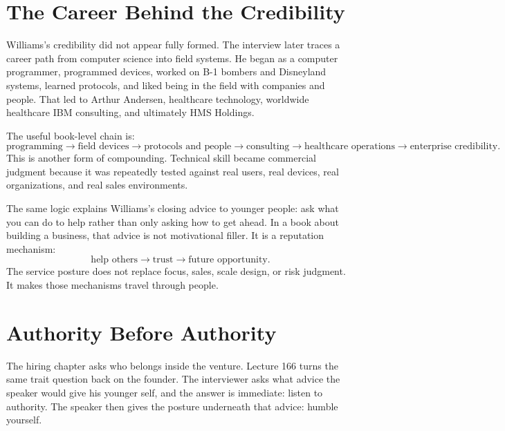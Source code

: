 \documentclass[11pt,oneside]{book}
\begin{document}
\section{The Career Behind the Credibility}

Williams's credibility did not appear fully formed. The interview later traces a career path from computer science into field systems. He began as a computer programmer, programmed devices, worked on B-1 bombers and Disneyland systems, learned protocols, and liked being in the field with companies and people. That led to Arthur Andersen, healthcare technology, worldwide healthcare IBM consulting, and ultimately HMS Holdings.

The useful book-level chain is:
\[
\text{programming}
\longrightarrow
\text{field devices}
\longrightarrow
\text{protocols and people}
\longrightarrow
\text{consulting}
\longrightarrow
\text{healthcare operations}
\longrightarrow
\text{enterprise credibility}.
\]
This is another form of compounding. Technical skill became commercial judgment because it was repeatedly tested against real users, real devices, real organizations, and real sales environments.

The same logic explains Williams's closing advice to younger people: ask what you can do to help rather than only asking how to get ahead. In a book about building a business, that advice is not motivational filler. It is a reputation mechanism:
\[
\text{help others}
\longrightarrow
\text{trust}
\longrightarrow
\text{future opportunity}.
\]
The service posture does not replace focus, sales, scale design, or risk judgment. It makes those mechanisms travel through people.


\section{Authority Before Authority}

The hiring chapter asks who belongs inside the venture. Lecture 166 turns the same trait question back on the founder. The interviewer asks what advice the speaker would give his younger self, and the answer is immediate: listen to authority. The speaker then gives the posture underneath that advice: humble yourself.
\end{document}
